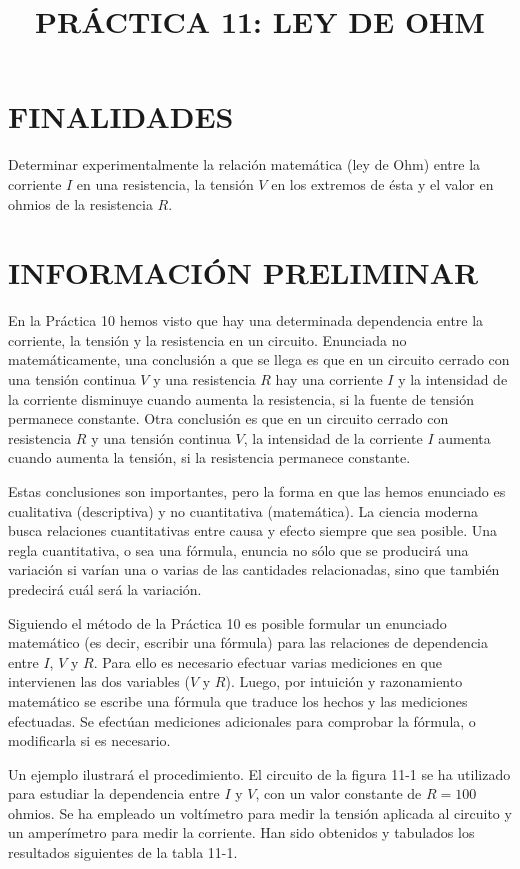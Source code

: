 \documentclass[12pt]{article}
\title{PRÁCTICA 11: LEY DE OHM}
\author{}
\date{}
\begin{document}
\maketitle

\section{FINALIDADES}
Determinar experimentalmente la relación matemática (ley de Ohm) entre la corriente \( I \) en una resistencia, la tensión \( V \) en los extremos de ésta y el valor en ohmios de la resistencia \( R \).

\section{INFORMACIÓN PRELIMINAR}
En la Práctica 10 hemos visto que hay una determinada dependencia entre la corriente, la tensión y la resistencia en un circuito. Enunciada no matemáticamente, una conclusión a que se llega es que en un circuito cerrado con una tensión continua \( V \) y una resistencia \( R \) hay una corriente \( I \) y la intensidad de la corriente disminuye cuando aumenta la resistencia, si la fuente de tensión permanece constante. Otra conclusión es que en un circuito cerrado con resistencia \( R \) y una tensión continua \( V \), la intensidad de la corriente \( I \) aumenta cuando aumenta la tensión, si la resistencia permanece constante.

Estas conclusiones son importantes, pero la forma en que las hemos enunciado es cualitativa (descriptiva) y no cuantitativa (matemática). La ciencia moderna busca relaciones cuantitativas entre causa y efecto siempre que sea posible. Una regla cuantitativa, o sea una fórmula, enuncia no sólo que se producirá una variación si varían una o varias de las cantidades relacionadas, sino que también predecirá cuál será la variación.

Siguiendo el método de la Práctica 10 es posible formular un enunciado matemático (es decir, escribir una fórmula) para las relaciones de dependencia entre \( I \), \( V \) y \( R \). Para ello es necesario efectuar varias mediciones en que intervienen las dos variables (\( V \) y \( R \)). Luego, por intuición y razonamiento matemático se escribe una fórmula que traduce los hechos y las mediciones efectuadas. Se efectúan mediciones adicionales para comprobar la fórmula, o modificarla si es necesario.

Un ejemplo ilustrará el procedimiento. El circuito de la figura 11-1 se ha utilizado para estudiar la dependencia entre \( I \) y \( V \), con un valor constante de \( R = 100 \) ohmios. Se ha empleado un voltímetro para medir la tensión aplicada al circuito y un amperímetro para medir la corriente. Han sido obtenidos y tabulados los resultados siguientes de la tabla 11-1.
\end{document}
